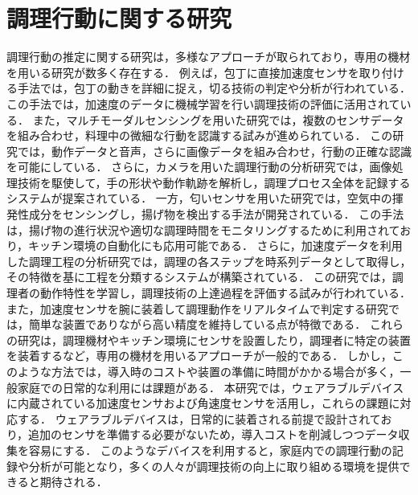 \section{調理行動に関する研究}
調理行動の推定に関する研究は，多様なアプローチが取られており，専用の機材を用いる研究が数多く存在する．
例えば，包丁に直接加速度センサを取り付ける手法では，包丁の動きを詳細に捉え，切る技術の判定や分析が行われている．この手法では，加速度のデータに機械学習を行い調理技術の評価に活用されている\cite{加速度センサを用いた包丁技術向上支援システムの提案}．
また，マルチモーダルセンシングを用いた研究では，複数のセンサデータを組み合わせ，料理中の微細な行動を認識する試みが進められている．
この研究では，動作データと音声，さらに画像データを組み合わせ，行動の正確な認識を可能にしている\cite{マルチモーダルセンシングに基づく料理中のマイクロ行動認識の提案}．
さらに，カメラを用いた調理行動の分析研究では，画像処理技術を駆使して，手の形状や動作軌跡を解析し，調理プロセス全体を記録するシステムが提案されている\cite{Cooking Activities Recognition in Egocentric Videos Using Hand Shape Feature with Openpose}．
一方，匂いセンサを用いた研究では，空気中の揮発性成分をセンシングし，揚げ物を検出する手法が開発されている．
この手法は，揚げ物の進行状況や適切な調理時間をモニタリングするために利用されており，キッチン環境の自動化にも応用可能である\cite{NOSE: A Novel Odor Sensing Engine for Ambient Monitoring of the Frying Cooking Method in Kitchen Environments}．
さらに，加速度データを利用した調理工程の分析研究では，調理の各ステップを時系列データとして取得し，その特徴を基に工程を分類するシステムが構築されている．
この研究では，調理者の動作特性を学習し，調理技術の上達過程を評価する試みが行われている\cite{A dataset for complex activity recognition with micro and macro activities in a cooking scenario}．また，加速度センサを腕に装着して調理動作をリアルタイムで判定する研究では，簡単な装置でありながら高い精度を維持している点が特徴である\cite{手首装着型の加速度センサを用いた実時間調理行動認識手法の実現}．
これらの研究は，調理機材やキッチン環境にセンサを設置したり，調理者に特定の装置を装着するなど，専用の機材を用いるアプローチが一般的である．
しかし，このような方法では，導入時のコストや装置の準備に時間がかかる場合が多く，一般家庭での日常的な利用には課題がある．
本研究では，ウェアラブルデバイスに内蔵されている加速度センサおよび角速度センサを活用し，これらの課題に対応する．
ウェアラブルデバイスは，日常的に装着される前提で設計されており，追加のセンサを準備する必要がないため，導入コストを削減しつつデータ収集を容易にする．
このようなデバイスを利用すると，家庭内での調理行動の記録や分析が可能となり，多くの人々が調理技術の向上に取り組める環境を提供できると期待される．

